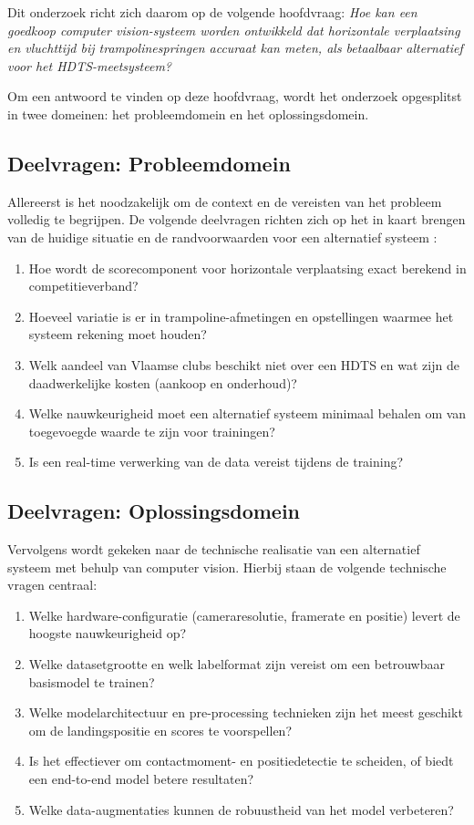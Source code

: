 Dit onderzoek richt zich daarom op de volgende hoofdvraag:
\textit{Hoe kan een goedkoop computer vision-systeem worden ontwikkeld dat horizontale verplaatsing en vluchttijd bij trampolinespringen accuraat kan meten, als betaalbaar alternatief voor het HDTS-meetsysteem?}

Om een antwoord te vinden op deze hoofdvraag, wordt het onderzoek opgesplitst in twee domeinen: het probleemdomein en het oplossingsdomein.

\subsection*{Deelvragen: Probleemdomein}
Allereerst is het noodzakelijk om de context en de vereisten van het probleem volledig te begrijpen. De volgende deelvragen richten zich op het in kaart brengen van de huidige situatie en de randvoorwaarden voor een alternatief systeem \autocite{Ferger2022}:
\begin{enumerate}
    \item Hoe wordt de scorecomponent voor horizontale verplaatsing exact berekend in competitieverband?
    \item Hoeveel variatie is er in trampoline-afmetingen en opstellingen waarmee het systeem rekening moet houden?
    \item Welk aandeel van Vlaamse clubs beschikt niet over een HDTS en wat zijn de daadwerkelijke kosten (aankoop en onderhoud)?
    \item Welke nauwkeurigheid moet een alternatief systeem minimaal behalen om van toegevoegde waarde te zijn voor trainingen?
    \item Is een real-time verwerking van de data vereist tijdens de training?
\end{enumerate}

\subsection*{Deelvragen: Oplossingsdomein}
Vervolgens wordt gekeken naar de technische realisatie van een alternatief systeem met behulp van computer vision. Hierbij staan de volgende technische vragen centraal:
\begin{enumerate}
    \item Welke hardware-configuratie (cameraresolutie, framerate en positie) levert de hoogste nauwkeurigheid op?
    \item Welke datasetgrootte en welk labelformat zijn vereist om een betrouwbaar basismodel te trainen?
    \item Welke modelarchitectuur en pre-processing technieken zijn het meest geschikt om de landingspositie en scores te voorspellen?
    \item Is het effectiever om contactmoment- en positiedetectie te scheiden, of biedt een end-to-end model betere resultaten?
    \item Welke data-augmentaties kunnen de robuustheid van het model verbeteren?
\end{enumerate}

